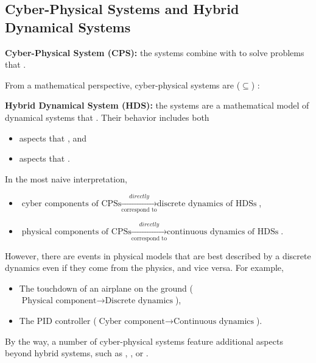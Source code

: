 \subsection{Cyber-Physical Systems and Hybrid Dynamical Systems}

\textbf{Cyber-Physical System (CPS):} the systems combine 
 with  
to solve problems that .

From a mathematical perspective, cyber-physical systems are ($\subseteq$) 
:

\textbf{Hybrid Dynamical System (HDS):} the systems are a mathematical model 
of dynamical systems that 
.
Their behavior includes both  
\vspace{-.5cm}
\begin{itemize}
  \item aspects that , and
  \item aspects that .
\end{itemize}

In the most naive interpretation, 
\vspace{-.5cm}
\begin{itemize}
  \item $\text{cyber components of CPSs} \xrightarrow[\text{correspond to}]
    {directly} \text{discrete dynamics of HDSs}$,
  \item $\text{physical components of CPSs} \xrightarrow[\text{correspond to}]
    {directly} \text{continuous dynamics of HDSs}$.
\end{itemize}

However, there are events in physical models that are best described by 
a discrete dynamics even if they come from the physics, and vice versa.
For example, 
\vspace{-.5cm}
\begin{itemize}
  \item The touchdown of an airplane on the ground 
    ($\text{Physical component} \to \text{Discrete dynamics}$),
  \item The PID controller 
    ($\text{Cyber component} \to \text{Continuous dynamics}$).
\end{itemize}

By the way, a number of cyber-physical systems feature additional 
  aspects beyond hybrid systems,
such as , ,
  or .

